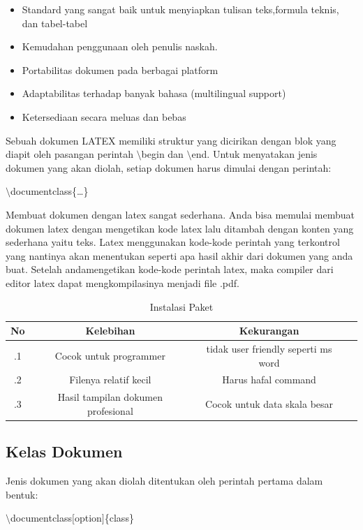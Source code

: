 \begin{itemize}
\item Standard yang sangat baik untuk menyiapkan tulisan teks,formula 
teknis, dan tabel-tabel
\item Kemudahan penggunaan oleh penulis naskah.
\item Portabilitas dokumen pada berbagai platform
\item Adaptabilitas terhadap banyak bahasa (multilingual support)
\item Ketersediaan secara meluas dan bebas
\end{itemize}
\hspace{0,5in}Sebuah dokumen LATEX memiliki struktur yang dicirikan dengan blok yang diapit oleh pasangan perintah $\setminus$begin dan $\setminus$end. 
Untuk menyatakan jenis dokumen yang akan diolah, setiap dokumen harus dimulai dengan perintah:\par \vspace{12pt} $\setminus$documentclass\{\ldots \}\par \vspace{12pt}

Membuat dokumen dengan latex sangat sederhana. Anda bisa memulai membuat dokumen latex dengan mengetikan kode latex lalu ditambah dengan konten yang sederhana yaitu teks. Latex menggunakan kode-kode perintah yang terkontrol yang nantinya akan menentukan seperti apa hasil akhir dari dokumen yang anda buat. Setelah andamengetikan kode-kode perintah latex, maka compiler dari editor latex dapat mengkompilasinya menjadi file .pdf. \par \vspace{12pt} 


\begin{table}[ht]
	\caption{Instalasi Paket}
	\centering
	\begin{tabular}{cccc}
		\hline
		No&Kelebihan&Kekurangan&\\
		\hline
		.1&Cocok untuk programmer&tidak user friendly seperti ms word&\\
		.2&Filenya relatif kecil&Harus hafal command&\\
		.3&Hasil tampilan dokumen profesional& Cocok untuk data skala besar&\\
		\hline
	\end{tabular}
\end{table}

\subsection {Kelas Dokumen}\par
\vspace{12pt}
Jenis dokumen yang akan diolah ditentukan oleh perintah pertama dalam bentuk: \par \vspace{12pt} $\setminus$documentclass$[$option$]$\{class\}\par \vspace{12pt}

